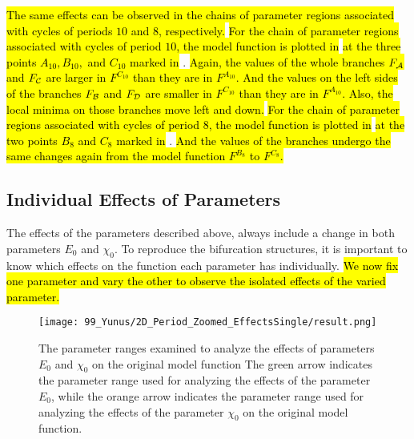 \hl{
	The same effects can be observed in the chains of parameter regions associated with cycles of periods $10$ and $8$, respectively.
}
\hl{For the chain of parameter regions associated with cycles of period $10$, the model function is plotted in}  \hl{at the three points $A_{10}, B_{10},$ and $C_{10}$ marked in} .
\hl{
	Again, the values of the whole branches $F_{\mathcal{A}}$ and $F_{\mathcal{C}}$ are larger in $F^{C_{10}}$ than they are in $F^{A_{10}}$.
	And the values on the left sides of the branches $F_{\mathcal{B}}$ and $F_{\mathcal{D}}$ are smaller in $F^{C_{10}}$ than they are in $F^{A_{10}}$.
	Also, the local minima on those branches move left and down.
}
\hl{For the chain of parameter regions associated with cycles of period $8$, the model function is plotted in}  \hl{at the two points $B_8$ and $C_8$ marked in} .
\hl{
	And the values of the branches undergo the same changes again from the model function $F^{B_8}$ to $F^{C_8}$.
}

\subsection{Individual Effects of Parameters}
\label{sec:setup.char.paramfx.individual}

The effects of the parameters described above, always include a change in both parameters $E_0$ and $\chi_0$.
To reproduce the bifurcation structures, it is important to know which effects on the function each parameter has individually.
\hl{
	We now fix one parameter and vary the other to observe the isolated effects of the varied parameter.
}

\begin{figure}
	\centering
	\texttt{[image: 99\_Yunus/2D\_Period\_Zoomed\_EffectsSingle/result.png]}
	\caption[The parameter ranges examined to analyze the effects of parameters on the original model function]{
		The parameter ranges examined to analyze the effects of parameters $E_0$ and $\chi_0$ on the original model function
		The green arrow indicates the parameter range used for analyzing the effects of the parameter $E_0$, while the orange arrow indicates the parameter range used for analyzing the effects of the parameter $\chi_0$ on the original model function.
	}
	\label{fig:setup.char.evolution.single.map}
\end{figure}

